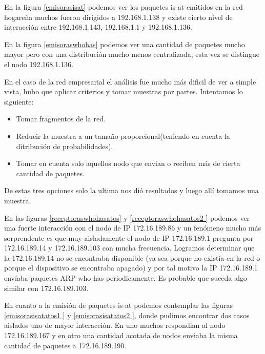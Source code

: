 En la figura \ref{emisorasisat} podemos ver los paquetes is-at emitidos en la red hogareña muchos fueron dirigidos a 192.168.1.138 y
existe cierto nivel de interacción entre 192.168.1.143, 192.168.1.1 y 192.168.1.136.

En la figura \ref{emisoraswhohas} podemos ver una cantidad de paquetes mucho mayor pero con una distribución mucho menos centralizada,
esta vez  se distingue el nodo 192.168.1.136.

En el caso de la red empresarial el análisis fue mucho más dificil de ver a simple vista, hubo que aplicar criterios y tomar muestras
por partes. Intentamos lo siguiente:
\begin{itemize}
\item Tomar fragmentos de la red.
\item Reducir la muestra a un tamaño proporcional(teniendo en cuenta la ditribución de probabilidades).
\item Tomar en cuenta solo aquellos nodo que envian o reciben más de cierta cantidad de paquetes.
\end{itemize} 

De estas tres opciones solo la ultima nos dió resultados y luego allí tomamos una muestra.

En las figuras \ref{receptoraswhohasatos} y \ref{receptoraswhohasatos2 } podemos ver una fuerte interacción con el nodo de IP 
172.16.189.86 y un fenómeno mucho más sorprendente es que muy aisladamente el nodo de IP 172.16.189.1 pregunta por 172.16.189.14
y 172.16.189.103 con mucha frecuencia. Logramos determinar que la 172.16.189.14 no se encontraba disponible (ya sea porque no existía 
en la red o porque el dispositivo se encontraba apagado) y por tal motivo la IP 172.16.189.1 envíaba paquetes ARP who-has periodicamente.
Es probable que suceda algo similar con 172.16.189.103.


En cuanto a la emisión de paquetes is-at podemos contemplar las figuras \ref{emisorasisatatos1 } y \ref{emisorasisatatos2 }, donde pudimos encontrar
dos casos aislados uno de mayor interacción. En uno  muchos respondian al nodo 172.16.189.167 y en otro una cantidad acotada de nodos
enviaba la misma cantidad de paquetes a 172.16.189.190.

